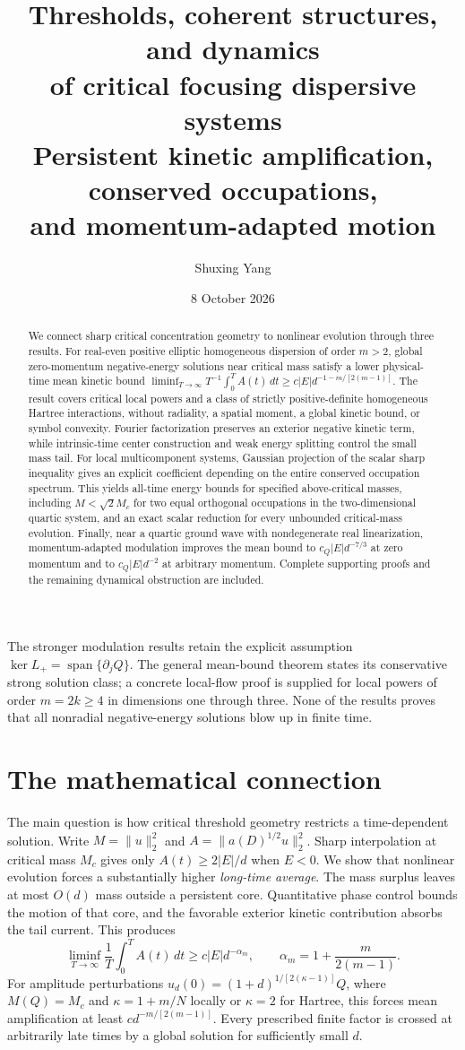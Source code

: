 \documentclass[11pt,a4paper]{article}
\title{Thresholds, coherent structures, and dynamics\\of critical focusing dispersive systems\\[5pt]
\large Persistent kinetic amplification, conserved occupations,\\and momentum-adapted motion}
\author{Shuxing Yang}
\date{8 October 2026}
\theoremstyle{remark}\newtheorem{remark}[theorem]{Remark}
\begin{document}
\maketitle
\begin{abstract}
We connect sharp critical concentration geometry to nonlinear evolution
through three results. For real-even positive elliptic homogeneous
dispersion of order $m>2$, global zero-momentum negative-energy
solutions near critical mass satisfy a lower physical-time mean kinetic
bound $\liminf_{T\to\infty}T^{-1}\int_0^T A(t)\,dt
\ge c|E|d^{-1-m/[2(m-1)]}$. The result covers critical local powers
and a class of strictly positive-definite homogeneous Hartree
interactions, without radiality, a spatial moment, a global kinetic
bound, or symbol convexity. Fourier factorization preserves an exterior
negative kinetic term, while intrinsic-time center construction and
weak energy splitting control the small mass tail.
For local multicomponent systems, Gaussian projection of the scalar
sharp inequality gives an explicit coefficient depending on the entire
conserved occupation spectrum. This yields all-time energy bounds for
specified above-critical masses, including $M<\sqrt2M_c$ for two equal
orthogonal occupations in the two-dimensional quartic system, and an
exact scalar reduction for every unbounded critical-mass evolution.
Finally, near a quartic ground wave with nondegenerate real linearization,
momentum-adapted modulation improves the mean bound to
$c_Q|E|d^{-7/3}$ at zero momentum and to $c_Q|E|d^{-2}$ at arbitrary
momentum. Complete supporting proofs and the remaining dynamical
obstruction are included.
\end{abstract}

The stronger modulation results
retain the explicit assumption $\ker L_+=\operatorname{span}\{\partial_jQ\}$.
The general mean-bound theorem states its conservative strong solution
class; a concrete local-flow proof is supplied for local powers of
order $m=2k\ge4$ in dimensions one through three. None of the results
proves that all nonradial negative-energy solutions blow up in finite time.

\section*{The mathematical connection}
The main question is how critical threshold geometry restricts a
time-dependent solution. Write $M=\|u\|_2^2$ and
$A=\|a(D)^{1/2}u\|_2^2$. Sharp interpolation at critical mass $M_c$
gives only $A(t)\ge2|E|/d$ when $E<0$. We show that nonlinear evolution
forces a substantially higher \emph{long-time average}. The mass surplus
leaves at most $O(d)$ mass outside a persistent core. Quantitative phase
control bounds the motion of that core, and the favorable exterior
kinetic contribution absorbs the tail current. This produces
\[
 \liminf_{T\to\infty}\frac1T\int_0^T A(t)\,dt
 \ge c|E|d^{-\alpha_m},\qquad
 \alpha_m=1+\frac{m}{2(m-1)}.
\]
For amplitude perturbations $u_d(0)=(1+d)^{1/[2(\kappa-1)]}Q$,
where $M(Q)=M_c$ and $\kappa=1+m/N$ locally or $\kappa=2$ for
Hartree, this forces mean amplification at least
$cd^{-m/[2(m-1)]}$. Every prescribed finite factor is crossed at
arbitrarily late times by a global solution for sufficiently small $d$.
\end{document}
